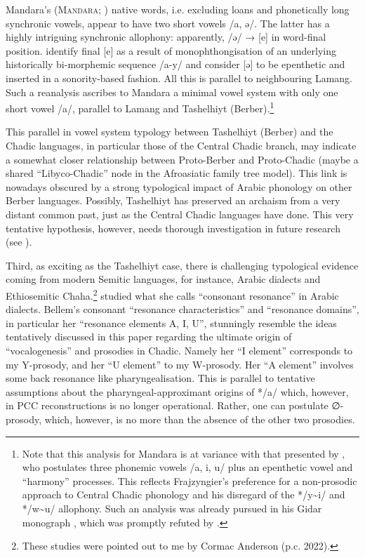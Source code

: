\documentclass[output=paper]{langscibook}
\begin{document}
Mandara’s (\textsc{Mandara}; \citealt{Mirt1969, FluckigerWhaley1981}) native words, i.e. excluding loans and phonetically long synchronic vowels, appear to have two short vowels /a, ə/. The latter has a highly intriguing synchronic allophony: apparently, /ə/ → [e] in word-final position. \citet{WolffNaumann2004} identify final [e] as a result of monophthongisation of an underlying historically bi-morphemic sequence /a-y/ and consider [ə] to be epenthetic and inserted in a sonority-based fashion. All this is parallel to neighbouring Lamang. Such a reanalysis ascribes to Mandara a minimal vowel system with only one short vowel /a/, parallel to Lamang and Tashelhiyt (Berber).\footnote{Note that this analysis for Mandara is at variance with that presented by \citet{Frajzyngier2012}, who postulates three phonemic vowels /a, i, u/ plus an epenthetic vowel and ``harmony'' processes. This reflects Frajzyngier’s preference for a non-prosodic approach to Central Chadic phonology and his disregard of the */y{\textasciitilde}i/ and */w{\textasciitilde}u/ allophony. Such an analysis was already pursued in his Gidar monograph \citep{Frajzyngier2008}, which was promptly refuted by \citet{Schuh2010}.}

This parallel in vowel system typology between Tashelhiyt (Berber) and the Chadic languages, in particular those of the Central Chadic branch, may indicate a somewhat closer relationship between Proto-Berber and Proto-Chadic (maybe a shared ``Libyco-Chadic'' node in the Afroasiatic family tree model). This link is nowadays obscured by a strong typological impact of Arabic phonology on other Berber languages. Possibly, Tashelhiyt has preserved an archaism from a very distant common past, just as the Central Chadic languages have done. This very tentative hypothesis, however, needs thorough investigation in future research (see \citealt{Wolff2022b}).

Third, as exciting as the Tashelhiyt case, there is challenging typological evidence coming from modern Semitic languages, for instance, Arabic dialects and Ethiosemitic Chaha.\footnote{These studies were pointed out to me by Cormac Anderson (p.c. 2022).} \citet{Bellem2007, Bellem2008} studied what she calls ``consonant resonance'' in Arabic dialects. Bellem’s consonant ``resonance characteristics'' and ``resonance domains'', in particular her ``resonance elements A, I, U'', stunningly resemble the ideas tentatively discussed in this paper regarding the ultimate origin of ``vocalogenesis'' and prosodies in Chadic. Namely her ``I element'' corresponds to my Y-prosody, and her ``U element'' to my W-prosody. Her ``A element'' involves some back resonance like pharyngealisation. This is parallel to tentative assumptions about the pharyngeal-approximant origins of */a/ which, however, in PCC reconstructions is no longer operational. Rather, one can postulate ∅-prosody, which, however, is no more than the absence of the other two prosodies.
\end{document}
